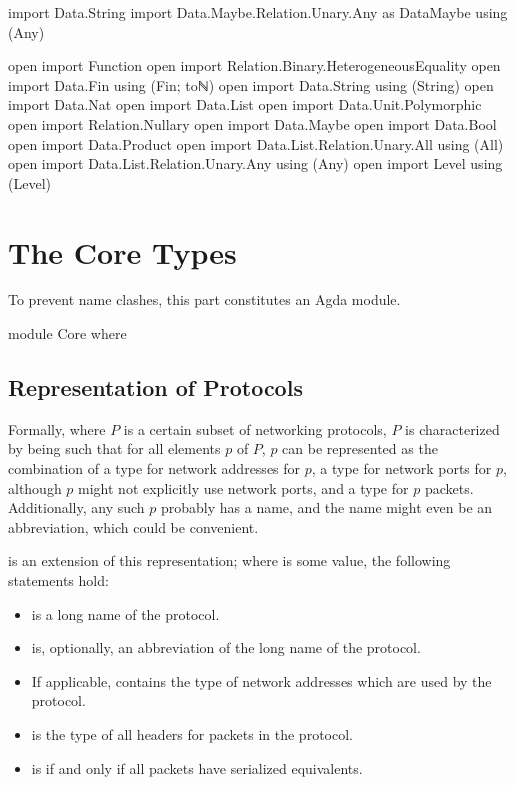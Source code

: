 \documentclass{report}
\begin{document}
\begin{code}
import Data.String
import Data.Maybe.Relation.Unary.Any as DataMaybe using (Any)

open import Function
open import Relation.Binary.HeterogeneousEquality
open import Data.Fin using (Fin; toℕ)
open import Data.String using (String)
open import Data.Nat
open import Data.List
open import Data.Unit.Polymorphic
open import Relation.Nullary
open import Data.Maybe
open import Data.Bool
open import Data.Product
open import Data.List.Relation.Unary.All using (All)
open import Data.List.Relation.Unary.Any using (Any)
open import Level using (Level)
\end{code}

\part{The Core Types}
To prevent name clashes, this part constitutes an Agda module.

\begin{code}
module Core where
\end{code}

\chapter{Representation of Protocols}
Formally, where \(P\) is a certain subset of networking protocols, \(P\) is characterized by being such that for all elements \(p\) of \(P\), \(p\) can be represented as the combination of a type for network addresses for \(p\), a type for network ports for \(p\), although \(p\) might not explicitly use network ports, and a type for \(p\) packets.  Additionally, any such \(p\) probably has a name, and the name might even be an abbreviation, which could be convenient.

 is an extension of this representation; where  is some   value, the following statements hold:
\begin{itemize}
  \item {}  is a long name of the  protocol.
  \item {}  is, optionally, an abbreviation of the long name of the  protocol.
  \item If applicable,   contains the type of network addresses which are used by the  protocol.
  \item {}  is the type of all headers for packets in the  protocol.
  \item {}  is  if and only if all  packets have serialized equivalents.
\end{itemize}
\end{document}
